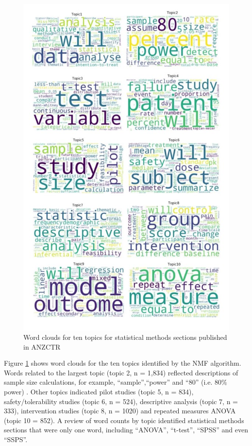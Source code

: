 \documentclass[12pt]{article}
\begin{document}
\begin{figure}

{\centering \includegraphics[width=0.7\linewidth]{figures/anzctrwordclouds} 

}

\caption{Word clouds for ten topics for statistical methods sections published in ANZCTR}\label{fig:anzctr-wordclouds}
\end{figure}

Figure \ref{fig:anzctr-wordclouds} shows word clouds for the ten topics identified by the NMF algorithm. 
Words related to the largest topic (topic 2, n = 1,834) reflected descriptions of sample size calculations, for example, ``sample'',``power'' and ``80'' (i.e. $80\%$ power) . Other topics indicated pilot studies (topic 5, n = 834),
safety/tolerability studies (topic 6, n = 524), descriptive analysis (topic 7, n = 333),
intervention studies (topic 8, n = 1020) and repeated measures ANOVA (topic 10 = 852). A review of word counts by topic 
identified statistical methods sections that were only one word, including ``ANOVA'',
``t-test'', ``SPSS'' and even ``SSPS''.
\end{document}
